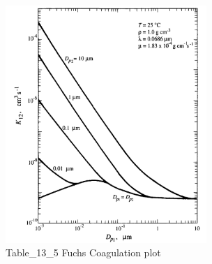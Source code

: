 \documentclass[12pt]{article}
\begin{document}
\begin{figure}\label{fig:problem-2-a-2}
\begin{center}
\includegraphics[width=3in]{Table_13_5_Fuchs_Coagulation_plot.png}
\caption{Table\_13\_5 Fuchs Coagulation plot}
\end{center}
\end{figure}
\end{document}
